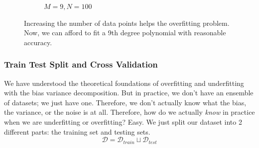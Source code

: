 \documentclass{article}
\theoremstyle{definition}
\begin{document}
\begin{figure}[hbt!]
\begin{subfigure}[b]{0.48\textwidth}
            \caption{$M = 9, N = 100$}
            \label{fig:more_points}
        \end{subfigure}
        \caption{Increasing the number of data points helps the overfitting problem. Now, we can afford to fit a 9th degree polynomial with reasonable accuracy.}
        \label{fig:reducing_overfitting_with_more_samples}
    \end{figure}

    \subsubsection{Train Test Split and Cross Validation}

    We have understood the theoretical foundations of overfitting and underfitting with the bias variance decomposition. But in practice, we don't have an ensemble of datasets; we just have one. Therefore, we don't actually know what the bias, the variance, or the noise is at all. Therefore, how do we actually \textit{know} in practice when we are underfitting or overfitting? Easy. We just split our dataset into 2 different parts: the training set and testing sets. 
    \[\mathcal{D} = \mathcal{D}_{train} \sqcup \mathcal{D}_{test}\]
\end{document}
